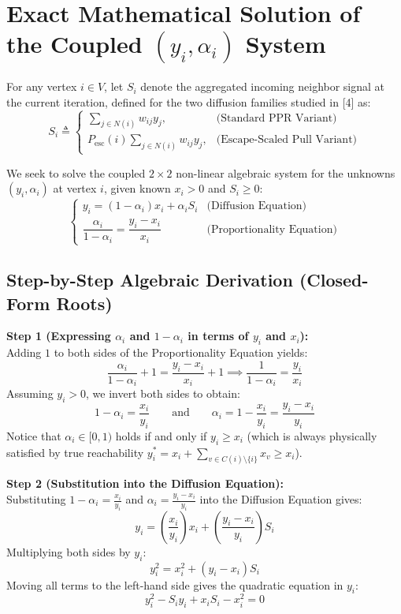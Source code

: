\documentclass[11pt, a4paper]{article}
\begin{document}
\section{Exact Mathematical Solution of the Coupled $(y_i, \alpha_i)$ System}

For any vertex $i \in V$, let $S_i$ denote the aggregated incoming neighbor signal at the current iteration, defined for the two diffusion families studied in [4] as:
\[
S_i \triangleq \begin{cases} \displaystyle\sum_{j \in N(i)} w_{ij} y_j, & \text{(Standard PPR Variant)} \\[12pt] \displaystyle P_{\mathrm{esc}}(i) \sum_{j \in N(i)} w_{ij} y_j, & \text{(Escape-Scaled Pull Variant)} \end{cases}
\]

We seek to solve the coupled $2 \times 2$ non-linear algebraic system for the unknowns $(y_i, \alpha_i)$ at vertex $i$, given known $x_i > 0$ and $S_i \ge 0$:
\[
\begin{cases}
y_i = (1 - \alpha_i) x_i + \alpha_i S_i & \text{(Diffusion Equation)} \\[8pt]
\dfrac{\alpha_i}{1 - \alpha_i} = \dfrac{y_i - x_i}{x_i} & \text{(Proportionality Equation)}
\end{cases}
\]

\subsection{Step-by-Step Algebraic Derivation (Closed-Form Roots)}

\noindent\textbf{Step 1 (Expressing $\alpha_i$ and $1 - \alpha_i$ in terms of $y_i$ and $x_i$):} \\
Adding $1$ to both sides of the Proportionality Equation yields:
\[
\frac{\alpha_i}{1 - \alpha_i} + 1 = \frac{y_i - x_i}{x_i} + 1 \implies \frac{1}{1 - \alpha_i} = \frac{y_i}{x_i}
\]
Assuming $y_i > 0$, we invert both sides to obtain:
\[
1 - \alpha_i = \frac{x_i}{y_i} \qquad \text{and} \qquad \alpha_i = 1 - \frac{x_i}{y_i} = \frac{y_i - x_i}{y_i}
\]
Notice that $\alpha_i \in [0, 1)$ holds if and only if $y_i \ge x_i$ (which is always physically satisfied by true reachability $y^*_i = x_i + \sum_{v \in C(i)\setminus\{i\}} x_v \ge x_i$).

\vspace{0.2cm}
\noindent\textbf{Step 2 (Substitution into the Diffusion Equation):} \\
Substituting $1 - \alpha_i = \frac{x_i}{y_i}$ and $\alpha_i = \frac{y_i - x_i}{y_i}$ into the Diffusion Equation gives:
\[
y_i = \left(\frac{x_i}{y_i}\right) x_i + \left(\frac{y_i - x_i}{y_i}\right) S_i
\]
Multiplying both sides by $y_i$:
\[
y_i^2 = x_i^2 + (y_i - x_i) S_i
\]
Moving all terms to the left-hand side gives the quadratic equation in $y_i$:
\[
y_i^2 - S_i y_i + x_i S_i - x_i^2 = 0
\]
\end{document}
